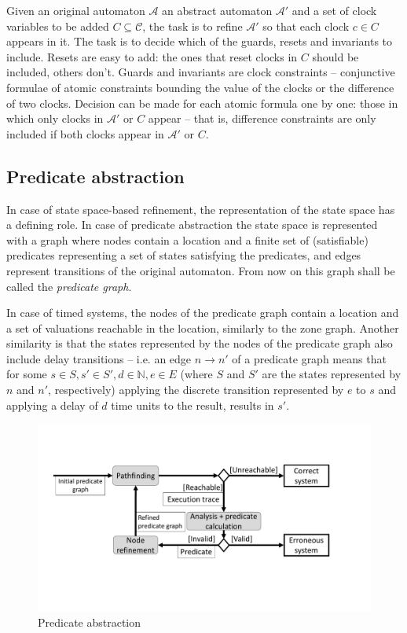 Given an original automaton $\mathcal{A}$ an abstract automaton $\mathcal{A'}$ and a set of clock variables to be added $C \subseteq \mathcal{C}$, the task is to refine $\mathcal{A'}$ so that each clock $c \in C$ appears in it. The task is to decide which of the guards, resets and invariants to include. Resets are easy to add: the ones that reset clocks in $C$ should be included, others don't. Guards and invariants are clock constraints -- conjunctive formulae of atomic constraints bounding the value of the clocks or the difference of two clocks. Decision can be made for each atomic formula one by one: those in which only clocks in $\mathcal{A'}$ or $C$ appear -- that is, difference constraints are only included if both clocks appear in $\mathcal{A'}$ or $C$.

\subsection{Predicate abstraction}

In case of state space-based refinement, the representation of the state space has a defining role. In case of predicate abstraction the state space is represented with a graph where nodes contain a location and a finite set of (satisfiable) predicates representing a set of states satisfying the predicates, and edges represent transitions of the original automaton. From now on this graph shall be called the \emph{predicate graph}.

In case of timed systems, the nodes of the predicate graph contain a location and a set of valuations reachable in the location, similarly to the zone graph. Another similarity is that the states represented by the nodes of the predicate graph also include delay transitions -- i.e. an edge $n \to n'$ of a predicate graph means that for some $s \in S, s' \in S', d \in \mathds{N}, e \in E$ (where $S$ and $S'$ are the states represented by $n$ and $n'$, respectively) applying the discrete transition represented by $e$ to $s$ and applying a delay of $d$ time units to the result, results in $s'$.

\begin{figure} 
	\centering
	\includegraphics[width=.7\textwidth]{include/figures/cegar_pred}
	\caption{Predicate abstraction}
	\label{fig:cegarpred}
\end{figure}

